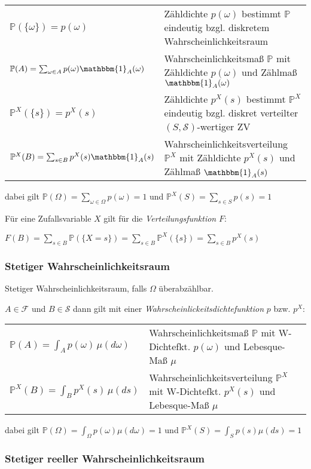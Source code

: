 \documentclass{article}
\begin{document}
\begin{tabular}{ll}
$\mathbb{P}(\{\omega\}) = p(\omega)$ & Zähldichte $p(\omega)$ bestimmt $\mathbb{P}$ eindeutig bzgl. diskretem Wahrscheinlichkeitsraum\\
$\mathbb{P}(A) = \sum_{\omega \in A} p(\omega) \mathbbm{1}_A(\omega)$ & Wahrscheinlichkeitsmaß $\mathbb{P}$ mit Zähldichte $p(\omega)$ und Zählmaß $\mathbbm{1}_A(\omega)$ \\
$\mathbb{P}^X(\{s\}) = p^X(s)$ & Zähldichte $p^X(s)$ bestimmt $\mathbb{P}^X$ eindeutig bzgl. diskret verteilter $(S,\mathcal{S})$-wertiger ZV\\
$\mathbb{P}^X(B) = \sum_{s \in B} p^X(s) \mathbbm{1}_A(s)$ & Wahrscheinlichkeitsverteilung $\mathbb{P}^X$ mit Zähldichte $p^X(s)$ und Zählmaß $\mathbbm{1}_A(s)$ \\
\end{tabular}

dabei gilt $\mathbb{P}(\Omega) = \sum_{\omega \in \Omega} p(\omega) = 1$ und $\mathbb{P}^X(S) = \sum_{s \in S} p(s) = 1$

Für eine Zufallsvariable $X$ gilt für die \emph{Verteilungsfunktion} $F$:

$F(B) = \sum_{s \in B} \mathbb{P}(\{X = s\}) = \sum_{s \in B} \mathbb{P}^X(\{s\}) = \sum_{s \in B} p^X(s)$

\subsubsection*{Stetiger Wahrscheinlichkeitsraum}

Stetiger Wahrscheinlichkeitsraum, falls $\Omega$ überabzählbar.

$A \in \mathcal{F}$ und $B \in \mathcal{S}$ dann gilt mit einer \emph{Wahrscheinlickeitsdichtefunktion} $p$ bzw. $p^X$:

\begin{tabular}{ll}
$\mathbb{P}(A) = \int_A p(\omega)\, \mu(d\omega)$ & Wahrscheinlichkeitsmaß $\mathbb{P}$ mit W-Dichtefkt. $p(\omega)$ und Lebesque-Maß $\mu$ \\
$\mathbb{P}^X(B) = \int_{B} p^X(s)\, \mu(ds)$ & Wahrscheinlichkeitsverteilung $\mathbb{P}^X$ mit W-Dichtefkt. $p^X(s)$ und Lebesque-Maß $\mu$ \\
\end{tabular}

dabei gilt $\mathbb{P}(\Omega) = \int_{\Omega} p(\omega) \mu(d\omega) = 1$ und $\mathbb{P}^X(S) = \int_{S} p(s) \mu(ds) = 1$

\subsubsection*{Stetiger reeller Wahrscheinlichkeitsraum}
\end{document}
